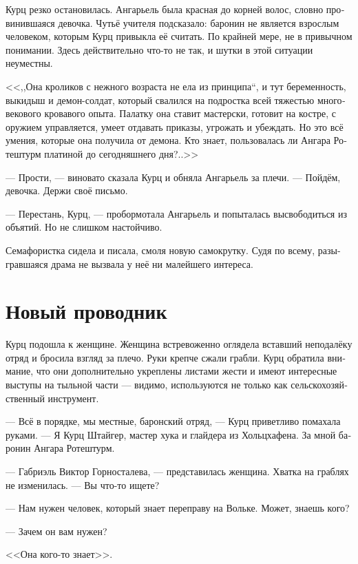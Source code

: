 \documentclass[a4paper,12pt,fleqn]{book}\usepackage{polyglossia}\setdefaultlanguage[babelshorthands=true]{russian}\setotherlanguage{english}\defaultfontfeatures{Ligatures=TeX,Mapping=tex-text}\usepackage{xcolor}\newcommand{\ml}[3]{#2}
\begin{document}
Курц резко остановилась.
Ангарьель была красная до корней волос, словно провинившаяся девочка.
Чутьё учителя подсказало: баронин не является взрослым человеком, которым Курц привыкла её считать.
По крайней мере, не в привычном понимании.
Здесь действительно что-то не так, и шутки в этой ситуации неуместны.

<<,,Она кроликов с нежного возраста не ела из принципа``, и тут беременность, выкидыш и демон-солдат, который свалился на подростка всей тяжестью многовекового кровавого опыта.
Палатку она ставит мастерски, готовит на костре, с оружием управляется, умеет отдавать приказы, угрожать и убеждать.
Но это всё умения, которые она получила от демона.
Кто знает, пользовалась ли Ангара Ротештурм платиной до сегодняшнего дня?..>>

--- Прости, --- виновато сказала Курц и обняла Ангарьель за плечи.
--- Пойдём, девочка.
Держи своё письмо.

--- Перестань, Курц, --- пробормотала Ангарьель и попыталась высвободиться из объятий.
Но не слишком настойчиво.

Семафористка сидела и писала, смоля новую самокрутку.
Судя по всему, разыгравшаяся драма не вызвала у неё ни малейшего интереса.

\section{Новый проводник}

Курц подошла к женщине.
Женщина встревоженно оглядела вставший неподалёку отряд и бросила взгляд за плечо.
Руки крепче сжали грабли.
Курц обратила внимание, что они дополнительно укреплены листами жести и имеют интересные выступы на тыльной части --- видимо, используются не только как сельскохозяйственный инструмент.

--- Всё в порядке, мы местные, баронский отряд, --- Курц приветливо помахала руками.
--- Я Курц Штайгер, мастер хука и глайдера из Хольцхафена.
За мной баронин Ангара Ротештурм.

\ml{$0$}
{--- Габриэль Виктор Горносталева, --- представилась женщина.}
{``Gabrielle Viktor Gornostalewa,'' the woman answered.}
Хватка на граблях не изменилась.
\ml{$0$}
{--- Вы что-то ищете?}
{``Looking for something?''}

--- Нам нужен человек, который знает переправу на Вольке.
Может, знаешь кого?

--- Зачем он вам нужен?

<<Она кого-то знает>>.
\end{document}
